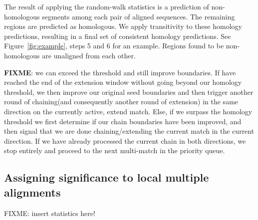 \documentclass[twoside,11pt]{article}
\begin{document}
The result of applying the random-walk statistics is a prediction of non-homologous segments among each pair of aligned sequences.  The remaining regions are predicted as homologous.  We apply transitivity to these homology predictions, resulting in a final set of consistent homology predictions.  See Figure~\ref{fig:example}, steps 5 and 6 for an example. Regions found to be non-homologous are unaligned from each other.


\textbf{FIXME}: we can exceed the threshold and still improve boundaries.  If have reached the end of the extension window without going beyond our homology threshold, we then improve our original seed boundaries and then trigger another round of chaining(and consequently another round of extension) in the same direction on the currently active, extend match. Else, if we surpass the homology threshold we first determine if our chain boundaries have been improved, and then signal that we are done chaining/extending the current match in the current direction. If we have already processed the current chain in both directions, we stop entirely and proceed to the next multi-match in the priority queue.


\subsection{Assigning significance to local multiple alignments}
FIXME: insert statistics here!
\end{document}
